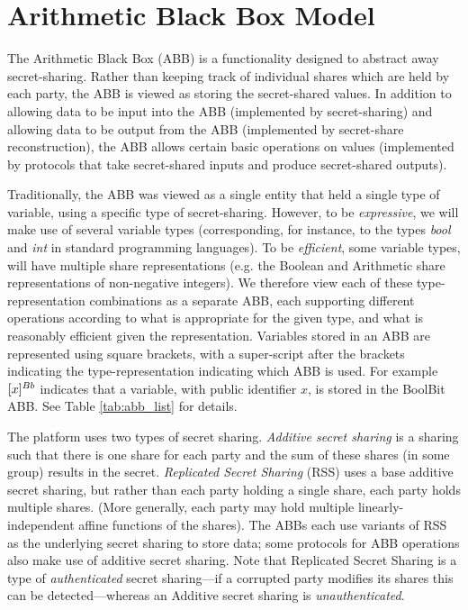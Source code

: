 \section{Arithmetic Black Box Model}

The Arithmetic Black Box (ABB) \cite{C:DamNie03} 
is a functionality designed to abstract away secret-sharing.
Rather than keeping track of individual shares which are held by each party,
the ABB is viewed as storing the secret-shared values.
In addition to allowing data to be input into the ABB (implemented by secret-sharing)
and allowing data to be output from the ABB (implemented by secret-share reconstruction),
the ABB allows certain basic operations on values 
(implemented by protocols that take secret-shared inputs and produce secret-shared outputs).

Traditionally, the ABB was viewed as a single entity that held a single type of variable,
using a specific type of secret-sharing.
However, to be \emph{expressive},
we will make use of several variable types
(corresponding, for instance, to the types \textit{bool} and \textit{int}
in standard programming languages).
To be \emph{efficient}, some variable types, will have multiple share representations
(e.g. the Boolean and Arithmetic share representations of non-negative integers).
We therefore view each of these type-representation combinations as a separate ABB,
each supporting different operations according to what is appropriate for the 
given type, and what is reasonably efficient given the representation.
Variables stored in an ABB are represented using square brackets,
with a super-script after the brackets indicating the type-representation 
indicating which ABB is used.
For example $[x]^{Bb}$ indicates that a variable, with public identifier $x$, 
is stored in the BoolBit ABB.
See Table \ref{tab:abb_list} for details.

The \SLCompute platform uses two types of secret sharing.
\emph{Additive secret sharing} is a sharing such that there is one share for each party
and the sum of these shares (in some group) results in the secret.
\emph{Replicated Secret Sharing} (RSS) uses a base additive secret sharing, 
but rather than each party holding a single share, each party holds multiple shares.
(More generally, each party may hold multiple linearly-independent 
affine functions of the shares).
The ABBs each use variants of RSS as the underlying secret sharing to store data;
some protocols for ABB operations also make use of additive secret sharing.
Note that Replicated Secret Sharing is a type of \emph{authenticated}
secret sharing---if a corrupted party modifies its shares this can be 
detected---whereas an Additive secret sharing is \emph{unauthenticated}.
